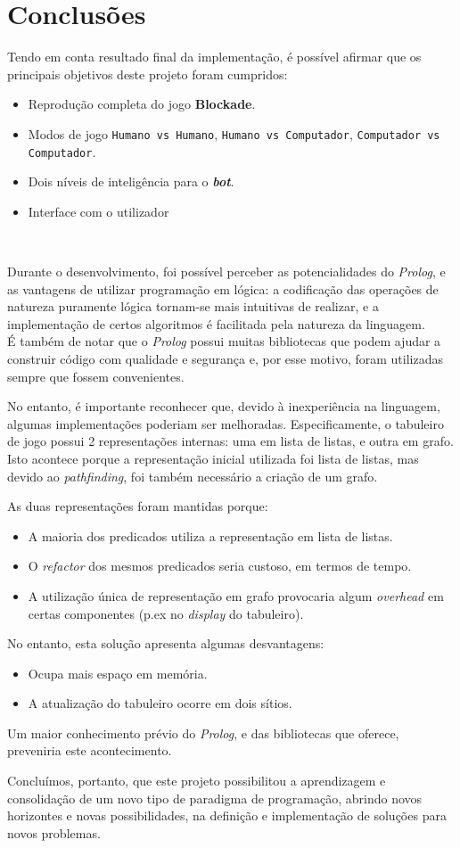 \documentclass[a4paper]{article}
\begin{document}
\section{Conclusões}
Tendo em conta resultado final da implementação, é possível afirmar que os principais objetivos deste projeto foram cumpridos:
\begin{itemize}
	\item Reprodução completa do jogo \textbf{Blockade}.
	\item Modos de jogo \texttt{Humano vs Humano}, \texttt{Humano vs Computador}, \texttt{Computador vs Computador}.
	\item Dois níveis de inteligência para o \textbf{\textit{bot}}.
	\item Interface com o utilizador
\end{itemize}
\ \par
Durante o desenvolvimento, foi possível perceber as potencialidades do \textit{Prolog}, e as vantagens de utilizar programação em lógica: a codificação das operações de natureza puramente lógica tornam-se mais intuitivas de realizar, e a implementação de certos algoritmos é facilitada pela natureza da linguagem. \\
É também de notar que o \textit{Prolog} possui muitas bibliotecas que podem ajudar a construir código com qualidade e segurança e, por esse motivo, foram utilizadas sempre que fossem convenientes. \par
No entanto, é importante reconhecer que, devido à inexperiência na linguagem, algumas implementações poderiam ser melhoradas. Especificamente, o tabuleiro de jogo possui 2 representações internas: uma em lista de listas, e outra em grafo. Isto acontece porque a representação inicial utilizada foi lista de listas, mas devido ao \textit{pathfinding}, foi também necessário a criação de um grafo. \par
As duas representações foram mantidas porque:
\begin{itemize}
	\item A maioria dos predicados utiliza a representação em lista de listas.
	\item O \textit{refactor} dos mesmos predicados seria custoso, em termos de tempo.
	\item A utilização única de representação em grafo provocaria algum \textit{overhead} em certas componentes (p.ex no \textit{display} do tabuleiro).
\end{itemize}
No entanto, esta solução apresenta algumas desvantagens:
\begin{itemize}
	\item Ocupa mais espaço em memória.
	\item A atualização do tabuleiro ocorre em dois sítios.
\end{itemize}
Um maior conhecimento prévio do \textit{Prolog}, e das bibliotecas que oferece, preveniria este acontecimento. \\ \par
Concluímos, portanto, que este projeto possibilitou a aprendizagem e consolidação de um novo tipo de paradigma de programação, abrindo novos horizontes e novas possibilidades, na definição e implementação de soluções para novos problemas.
\end{document}
